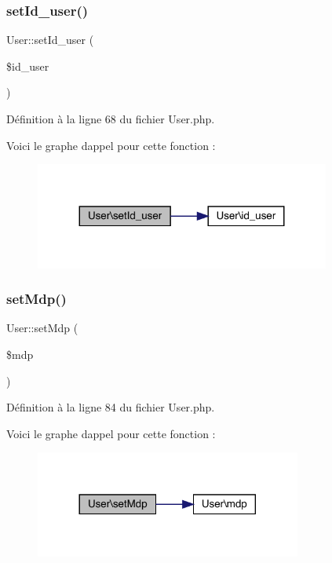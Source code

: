 \subsubsection{\texorpdfstring{set\+Id\+\_\+user()}{setId\_user()}}
{\footnotesize\ttfamily User\+::set\+Id\+\_\+user (\begin{DoxyParamCaption}\item[{}]{\$id\+\_\+user }\end{DoxyParamCaption})}



Définition à la ligne 68 du fichier User.\+php.

Voici le graphe d\textquotesingle{}appel pour cette fonction \+:\nopagebreak
\begin{figure}[H]
\begin{center}
\leavevmode
\includegraphics[width=275pt]{class_user_ab72d9e4455c1813e3be5a8d422b2812d_cgraph}
\end{center}
\end{figure}
\mbox{\label{class_user_a8e226641b5743164054123f3dbe3a341}} 
\subsubsection{\texorpdfstring{set\+Mdp()}{setMdp()}}
{\footnotesize\ttfamily User\+::set\+Mdp (\begin{DoxyParamCaption}\item[{}]{\$mdp }\end{DoxyParamCaption})}



Définition à la ligne 84 du fichier User.\+php.

Voici le graphe d\textquotesingle{}appel pour cette fonction \+:\nopagebreak
\begin{figure}[H]
\begin{center}
\leavevmode
\includegraphics[width=248pt]{class_user_a8e226641b5743164054123f3dbe3a341_cgraph}
\end{center}
\end{figure}
\mbox{\label{class_user_a84973efb146fe894e77bee5fe3b08f75}} 

